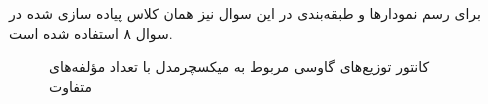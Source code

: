 \documentclass[12pt,onecolumn,a4paper]{article}
\begin{document}
برای رسم نمودارها و طبقه‌بندی در این سوال نیز همان کلاس پیاده سازی شده در سوال ۸ استفاده شده است. 

\begin{figure}[h]
    \centering
    \caption{کانتور توزیع‌های گاوسی مربوط به میکسچرمدل با تعداد مؤلفه‌های متفاوت}
    \label{fig:7}
\end{figure}
\end{document}
